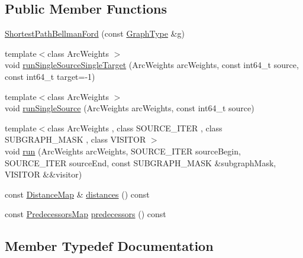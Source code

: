 \subsection*{Public Member Functions}
\begin{DoxyCompactItemize}
\item 
\hyperlink{classnifty_1_1graph_1_1ShortestPathBellmanFord_a08ea9d3d6bd1367f28dae95369da683c}{Shortest\+Path\+Bellman\+Ford} (const \hyperlink{classnifty_1_1graph_1_1ShortestPathBellmanFord_a927d9f2cee4c4f0f6e87df05de2af6bb}{Graph\+Type} \&g)
\item 
{\footnotesize template$<$class Arc\+Weights $>$ }\\void \hyperlink{classnifty_1_1graph_1_1ShortestPathBellmanFord_a0b0ac675dcade4a09ac4c54a55ffb322}{run\+Single\+Source\+Single\+Target} (Arc\+Weights arc\+Weights, const int64\+\_\+t source, const int64\+\_\+t target=-\/1)
\item 
{\footnotesize template$<$class Arc\+Weights $>$ }\\void \hyperlink{classnifty_1_1graph_1_1ShortestPathBellmanFord_a2a400586a2b42f61751668b9e4539b62}{run\+Single\+Source} (Arc\+Weights arc\+Weights, const int64\+\_\+t source)
\item 
{\footnotesize template$<$class Arc\+Weights , class S\+O\+U\+R\+C\+E\+\_\+\+I\+T\+ER , class S\+U\+B\+G\+R\+A\+P\+H\+\_\+\+M\+A\+SK , class V\+I\+S\+I\+T\+OR $>$ }\\void \hyperlink{classnifty_1_1graph_1_1ShortestPathBellmanFord_ac70ef6c0b842b0ff7b7046d73e79a08c}{run} (Arc\+Weights arc\+Weights, S\+O\+U\+R\+C\+E\+\_\+\+I\+T\+ER source\+Begin, S\+O\+U\+R\+C\+E\+\_\+\+I\+T\+ER source\+End, const S\+U\+B\+G\+R\+A\+P\+H\+\_\+\+M\+A\+SK \&subgraph\+Mask, V\+I\+S\+I\+T\+OR \&\&visitor)
\item 
const \hyperlink{classnifty_1_1graph_1_1ShortestPathBellmanFord_a00b64f4bc8316d99c4f029b2b37da74c}{Distance\+Map} \& \hyperlink{classnifty_1_1graph_1_1ShortestPathBellmanFord_a7c44f07f599f66f5831058b4156065d0}{distances} () const
\item 
const \hyperlink{classnifty_1_1graph_1_1ShortestPathBellmanFord_a9eca03af1ee4e886ed7da46dae5d5703}{Predecessors\+Map} \hyperlink{classnifty_1_1graph_1_1ShortestPathBellmanFord_af630b1048d1a4f3c5ccf410a96dd1e42}{predecessors} () const
\end{DoxyCompactItemize}


\subsection{Member Typedef Documentation}
\mbox{\label{classnifty_1_1graph_1_1ShortestPathBellmanFord_a00b64f4bc8316d99c4f029b2b37da74c}} 
